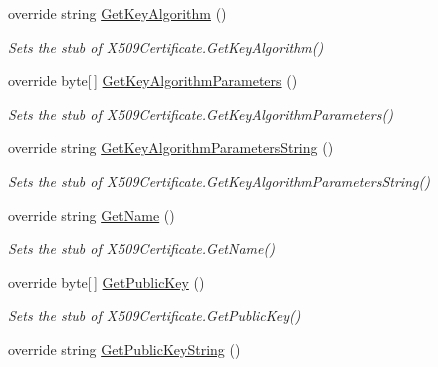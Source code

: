 \begin{DoxyCompactItemize}
override string \hyperlink{class_system_1_1_security_1_1_cryptography_1_1_x509_certificates_1_1_fakes_1_1_stub_x509_certificate_a7f784a06521b200a77a190cf57c37c2b}{Get\-Key\-Algorithm} ()
\begin{DoxyCompactList}\small\item\em Sets the stub of X509\-Certificate.\-Get\-Key\-Algorithm()\end{DoxyCompactList}\item 
override byte\mbox{[}$\,$\mbox{]} \hyperlink{class_system_1_1_security_1_1_cryptography_1_1_x509_certificates_1_1_fakes_1_1_stub_x509_certificate_ae17ad1a0494d9104f919b928021d8206}{Get\-Key\-Algorithm\-Parameters} ()
\begin{DoxyCompactList}\small\item\em Sets the stub of X509\-Certificate.\-Get\-Key\-Algorithm\-Parameters()\end{DoxyCompactList}\item 
override string \hyperlink{class_system_1_1_security_1_1_cryptography_1_1_x509_certificates_1_1_fakes_1_1_stub_x509_certificate_ae0e25f9220a5953e9cfdb7a3c2441652}{Get\-Key\-Algorithm\-Parameters\-String} ()
\begin{DoxyCompactList}\small\item\em Sets the stub of X509\-Certificate.\-Get\-Key\-Algorithm\-Parameters\-String()\end{DoxyCompactList}\item 
override string \hyperlink{class_system_1_1_security_1_1_cryptography_1_1_x509_certificates_1_1_fakes_1_1_stub_x509_certificate_a70caad9e00a345e2f7c5236435878231}{Get\-Name} ()
\begin{DoxyCompactList}\small\item\em Sets the stub of X509\-Certificate.\-Get\-Name()\end{DoxyCompactList}\item 
override byte\mbox{[}$\,$\mbox{]} \hyperlink{class_system_1_1_security_1_1_cryptography_1_1_x509_certificates_1_1_fakes_1_1_stub_x509_certificate_af9231b22ccab3a514d665cfb9578668f}{Get\-Public\-Key} ()
\begin{DoxyCompactList}\small\item\em Sets the stub of X509\-Certificate.\-Get\-Public\-Key()\end{DoxyCompactList}\item 
override string \hyperlink{class_system_1_1_security_1_1_cryptography_1_1_x509_certificates_1_1_fakes_1_1_stub_x509_certificate_a00dcdfb066581cdeb036aed4f12750de}{Get\-Public\-Key\-String} ()

\end{DoxyCompactItemize}

